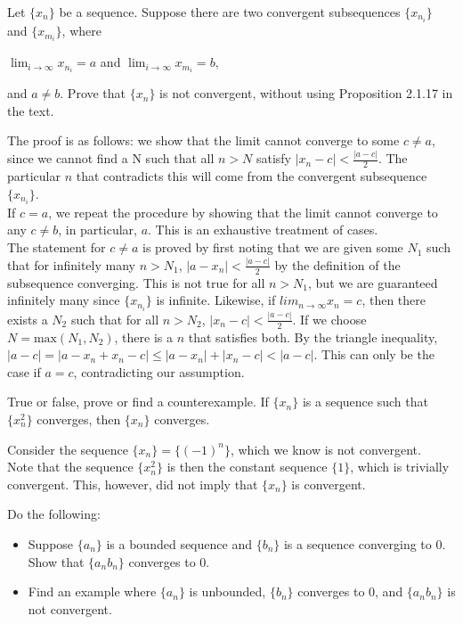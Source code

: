 \documentclass[11 pt]{article}
\begin{document}
\pagebreak
\begin{problem}
Let $\{x_n\}$ be a sequence. Suppose there are two convergent subsequences $\{x_n_i\}$ and $\{x_m_i\}$, where\\
\begin{center}
	$\lim_{i\to\infty}x_n_i=a$ and $\lim_{i\to\infty}x_m_i=b,$
\end{center}
and $a\neq b$. Prove that $\{x_n\}$ is not convergent, without using Proposition 2.1.17 in the text.
\end{problem}
\begin{solution}
	The proof is as follows: we show that the limit cannot converge to some $c\neq a$, since we cannot find a N such that all $n>N$ satisfy $|x_n-c|<\frac{|a-c|}{2}$. The particular $n$ that contradicts this will come from the convergent subsequence $\{x_n_i\}$.\\
	If $c=a$, we repeat the procedure by showing that the limit cannot converge to any $c\neq b$, in particular, $a$. This is an exhaustive treatment of cases.\\
	The statement for $c\neq a$ is proved by first noting that we are given some $N_1$ such that for infinitely many $n>N_1$, $|a-x_n|<\frac{|a-c|}{2}$ by the definition of the subsequence converging. This is not true for all $n>N_1$, but we are guaranteed infinitely many since $\{x_n_i\}$ is infinite.
	Likewise, if $lim_{n \to \infty}x_n=c$, then there exists a $N_2$ such that for all $n>N_2$, $|x_n-c|<\frac{|a-c|}{2}$. If we choose $N=\text{max}(N_1, N_2)$, there is a $n$ that satisfies both.
	By the triangle inequality, $|a-c|=|a-x_n+x_n-c|\leq|a-x_n|+|x_n-c|<|a-c|$. This can only be the case if  $a=c$, contradicting our assumption.
\end{solution}
\pagebreak
\begin{problem}
	True or false, prove or find a counterexample. If $\{x_n\}$ is a sequence such that $\{x_n^2\}$ converges, then $\{x_n\}$ converges.
\end{problem}
\begin{solution}
	Consider the sequence $\{x_n\}=\{(-1)^n\}$, which we know is not convergent.\\
	Note that the sequence $\{x_n^2\}$ is then the constant sequence $\{1\}$, which is trivially convergent. This, however, did not imply that $\{x_n\}$ is convergent.
\end{solution}
\pagebreak
\begin{problem}
	Do the following:
	\begin{itemize}
	\item Suppose $\{a_n\}$ is a bounded sequence and $\{b_n\}$ is a sequence converging to 0. Show that $\{a_nb_n\}$ converges to 0.
	\item Find an example where $\{a_n\}$ is unbounded, $\{b_n\}$ converges to 0, and $\{a_nb_n\}$ is not convergent.
	\end{itemize}
\end{problem}
\end{document}
